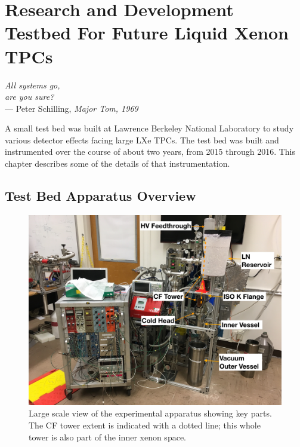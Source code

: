\chapter{Research and Development Testbed For Future Liquid Xenon TPCs}

\label{ch:testbed} %

\begin{flushright}{\slshape    
  All systems go, \\ are you sure? } \\ \medskip
    --- {Peter Schilling, \textit{Major Tom, 1969}}
\end{flushright}


A small test bed was built at Lawrence Berkeley National Laboratory to study various detector effects facing large \ac{LXe} \ac{TPC}s. The test bed was built and instrumented over the course of about two years, from 2015 through 2016. This chapter describes some of the details of that instrumentation.

\section{Test Bed Apparatus Overview}

\begin{figure}[htbp]
\begin{center}
\includegraphics[width=\textwidth]{figures/testbed/apparatus.jpg}
\caption{Large scale view of the experimental apparatus showing key parts. The \acs{CF} tower extent is indicated with a dotted line; this whole tower is also part of the inner xenon space.}
\label{fig:apparatus}
\end{center}
\end{figure}

